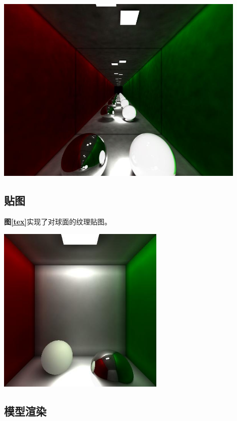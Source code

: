 \documentclass[11pt, a4paper]{article}
\makeatletter
\newcommand\fcaption{\def\@captype{figure}\caption}
\newcommand{\fref}[1]{\textbf{图\ref{#1}}}
\makeatother
\begin{document}
\begin{center}
    \includegraphics[width=12cm]{../outputs/anti_two_balls_multi_lights.jpeg}
    \fcaption{Two balls with multi lights}\label{ml}
\end{center}

\subsection{贴图}

\fref{tex}实现了对球面的纹理贴图。

\begin{center}
    \includegraphics[width=8cm]{../outputs/texture.jpeg}
    \fcaption{简单球面贴图}\label{tex}
\end{center}

\subsection{模型渲染}
\end{document}
